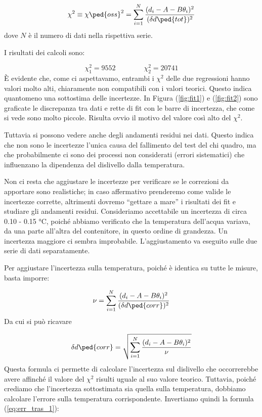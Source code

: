 \begin{equation}
    \chi^2 \equiv \chi\ped{oss}^2 = \sum_{i=1}^{N} \frac{(d_i - A - B\theta_i)^2}{(\delta d\ped{tot})^2}
    \label{eq:chi2}
\end{equation}
%
dove $N$ è il numero di dati nella rispettiva serie. 

I risultati dei calcoli sono:

\begin{equation}
    \chi_1^2 = 9552 \qquad \qquad \chi_2^2 = 20741
\end{equation}
%
\`E evidente che, come ci aspettavamo, entrambi i $\chi^2$ delle due regressioni hanno valori molto alti, chiaramente non compatibili con
i valori teorici. Questo indica quantomeno una sottostima delle incertezze. In Figura (\ref{fig:fit1}) e (\ref{fig:fit2}) sono
graficate le discrepanza tra dati e rette di fit con le barre di incertezza, che come si vede sono molto piccole. Risulta ovvio il motivo del
valore così alto del $\chi^2$.

Tuttavia si possono vedere anche degli andamenti residui nei dati. Questo indica che non sono le incertezze l'unica
causa del fallimento del test del chi quadro, ma che probabilmente ci sono dei processi non considerati (errori sistematici)
che influenzano la dipendenza del dislivello dalla temperatura.

Non ci resta che aggiustare le incertezze per verificare se le correzioni da apportare sono realistiche; in caso affermativo
prenderemo come valide le incertezze corrette, altrimenti dovremo ``gettare a mare'' i risultati dei fit e studiare gli
andamenti residui.
Consideriamo accettabile un incertezza di circa 0.10 - 0.15 \si{\celsius}, poiché abbiamo verificato che la temperatura dell'acqua
variava, da una parte all'altra del contenitore, in questo ordine di grandezza. Un incertezza maggiore ci sembra improbabile.
L'aggiustamento va eseguito sulle due serie di dati separatamente.

Per aggiustare l'incertezza sulla temperatura, poiché è identica su tutte le misure, basta imporre:

\begin{equation}
    \nu = \sum_{i=1}^{N} \frac{(d_i - A - B\theta_i)^2}{(\delta d\ped{corr})^2}
\end{equation}
%
Da cui si può ricavare

\begin{equation}
    \delta d\ped{corr} = \sqrt{\sum_{i=1}^{N} \frac{(d_i - A - B\theta_i)^2}{\nu}}
    \label{eq:corr_err}
\end{equation}
%
Questa formula ci permette di calcolare l'incertezza sul dislivello che occorrerebbe avere affinché il valore del $\chi^2$
risulti uguale al suo valore teorico. Tuttavia, poiché crediamo che l'incertezza sottostimata sia quella sulla temperatura,
dobbiamo calcolare l'errore sulla temperatura corrispondente. Invertiamo quindi la formula (\ref{eq:err_tras_1}):

